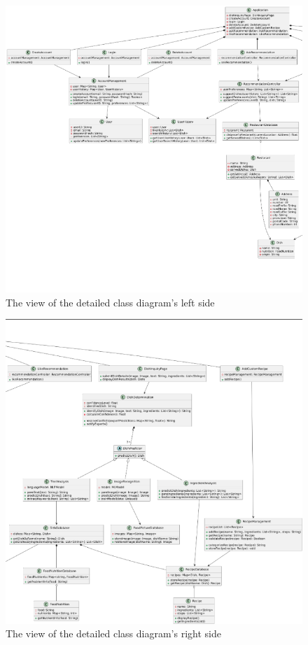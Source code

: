 \documentclass[]{article}
\begin{document}
\begin{figure}[H]
	\centering
	\includegraphics[width=\textwidth]{image/classDiagLeft.png}
	\caption{The view of the detailed class diagram's left side}
\end{figure}

\begin{figure}[H]
	\centering
	\includegraphics[width=\textwidth]{image/classDiagRight.png}
	\caption{The view of the detailed class diagram's right side}
\end{figure}
\end{document}
